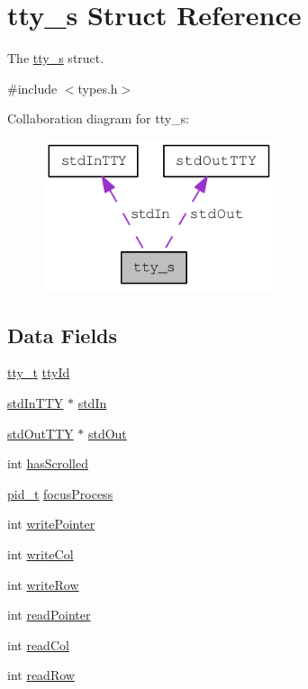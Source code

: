 \hypertarget{structtty__s}{
\section{tty\_\-s Struct Reference}
\label{structtty__s}
}


The \hyperlink{structtty__s}{tty\_\-s} struct.  




{\ttfamily \#include $<$types.h$>$}



Collaboration diagram for tty\_\-s:\nopagebreak
\begin{figure}[H]
\begin{center}
\leavevmode
\includegraphics[width=192pt]{structtty__s__coll__graph}
\end{center}
\end{figure}
\subsection*{Data Fields}
\begin{DoxyCompactItemize}
\item 
\hyperlink{types_8h_a10bbb7176245baeab9f398547c410779}{tty\_\-t} \hyperlink{structtty__s_a7bdcbca143d0773edef7d01762d42aff}{ttyId}
\item 
\hyperlink{structstd_in_t_t_y}{stdInTTY} $\ast$ \hyperlink{structtty__s_a44c2fc56a32fd5125ebc51b6b2c0e178}{stdIn}
\item 
\hyperlink{structstd_out_t_t_y}{stdOutTTY} $\ast$ \hyperlink{structtty__s_a0651a2e4ac304fdc5837a8eb0b0bd166}{stdOut}
\item 
int \hyperlink{structtty__s_a5be2ba5c5e17899443300974060fe13f}{hasScrolled}
\item 
\hyperlink{types_8h_ab612a3a4eb0e2ced1e55ecff76260458}{pid\_\-t} \hyperlink{structtty__s_afefb5a7d2161ce434bcc2bbb358d5b0b}{focusProcess}
\item 
int \hyperlink{structtty__s_a3a1ce6ba5935d1763d5b04f50fee62f7}{writePointer}
\item 
int \hyperlink{structtty__s_ae1216492f5b395a931efcab6127d0160}{writeCol}
\item 
int \hyperlink{structtty__s_a0bd76a596e01d0e7b4775aab29dcf425}{writeRow}
\item 
int \hyperlink{structtty__s_aa0a6145a711115035caf96d6d1c7d9fb}{readPointer}
\item 
int \hyperlink{structtty__s_a38beda239dc9e9eb6f58cc2e818fbaa6}{readCol}
\item 
int \hyperlink{structtty__s_a0aef55ec53e97b2ad384eb814d316e9b}{readRow}
\end{DoxyCompactItemize}


